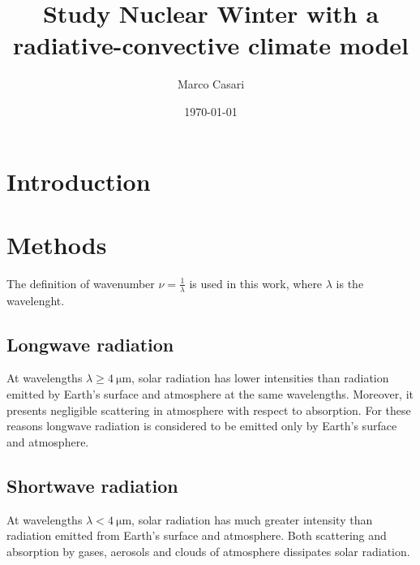 \documentclass[a4paper,10pt,draft,twocolumn]{article}
\begin{document}
\title{Study Nuclear Winter with a radiative-convective climate model} %
\author{Marco Casari}
\date{\today}
\maketitle

\begin{abstract}
\end{abstract}


\section{Introduction}


\section{Methods}
The definition of wavenumber $\nu = \frac{1}{\lambda}$ is used in this work, where $\lambda$ is the wavelenght.

\subsection{Longwave radiation}
At wavelengths $\lambda \geq \SI{4}{\micro\metre}$, solar radiation has lower intensities than radiation emitted by Earth's surface and atmosphere at the same wavelengths. Moreover, it presents negligible scattering in atmosphere with respect to absorption. For these reasons longwave radiation is considered to be emitted only by Earth's surface and atmosphere.\cite[468]{ramanathan}


\subsection{Shortwave radiation}
At wavelengths $\lambda < \SI{4}{\micro\metre}$, solar radiation has much greater intensity than radiation emitted from Earth's surface and atmosphere. Both scattering and absorption by gases, aerosols and clouds of atmosphere dissipates solar radiation.\cite[469]{ramanathan}
\end{document}
